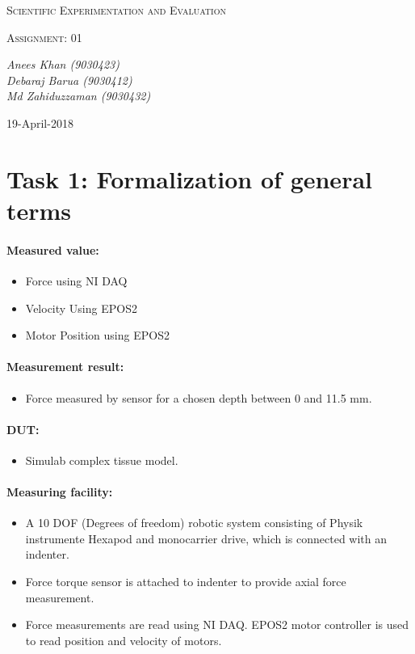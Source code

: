 \documentclass[10pt,a4paper]{article}
\begin{document}
	\begin{titlepage}
	\centering
	
		{\scshape\LARGE Scientific Experimentation and Evaluation\par}
		
		{\scshape\Large Assignment: 01\par}
	
		\vfill
		
		\vfill
		{\Large\itshape Anees Khan (9030423)
			\\Debaraj Barua (9030412)\\
			Md Zahiduzzaman (9030432)
			\par}
		\vfill
			
		{\large 19-April-2018\par}
	\end{titlepage}
	\tableofcontents
	
	\newpage
	\section{Task 1: Formalization of general terms}
		\paragraph{Measured value:}
			\begin{itemize}
				\item Force using NI DAQ
				\item Velocity Using EPOS2
				\item Motor Position using EPOS2
			\end{itemize}
		\paragraph{Measurement result:}
			\begin{itemize}
				\item Force measured by sensor for a chosen depth between 0 and 11.5 mm. 
			\end{itemize}
		\paragraph{DUT:}
			\begin{itemize}
				\item Simulab complex tissue model.
			\end{itemize}
		\paragraph{Measuring facility:}
			\begin{itemize}
				\item A 10 DOF (Degrees of freedom) robotic system consisting of Physik instrumente Hexapod and monocarrier drive, which is connected with an indenter. 
				\item Force torque sensor is attached to indenter to provide axial force measurement.     
				\item Force measurements are read using NI DAQ. EPOS2 motor controller is used to read position and velocity of motors. 
			\end{itemize}
\end{document}
